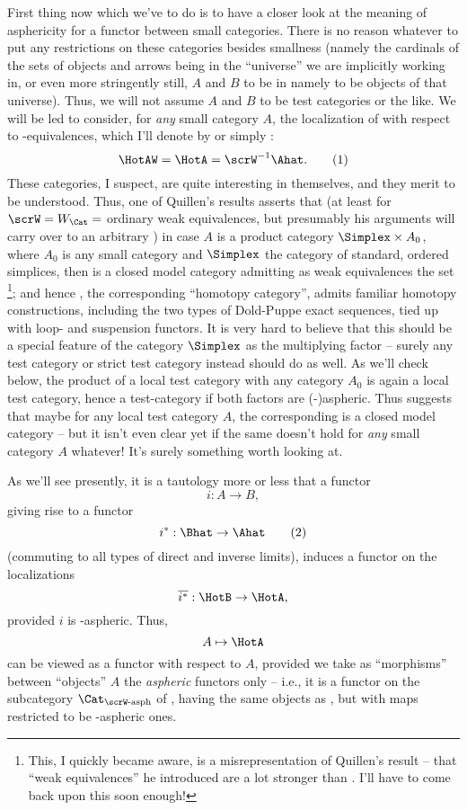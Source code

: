 First thing now which we've to do is to have a closer look at the
meaning of asphericity for a functor between small categories. There
is no reason whatever to put any restrictions on these categories
besides smallness (namely the cardinals of the sets of objects and
arrows being in the ``universe'' we are implicitly working in, or even
more stringently still, $A$ and $B$ to be in \Cat{} namely to be
objects of that universe). Thus, we will not assume $A$ and $B$ to be
test categories or the like. We will be led to consider, for
\emph{any} small category $A$, the localization of \Ahat{} with
respect to \scrW-equivalences, which I'll denote by \HotAW{} or simply
\HotA:
\begin{equation}
  \label{eq:67.1}
  \HotAW=\HotA=\scrW^{-1}\Ahat.\tag{1}
\end{equation}
These categories, I suspect, are quite interesting in
themselves, and they merit to be understood. Thus, one of Quillen's
results asserts that (at least for $\scrW=W_\Cat=$ ordinary weak
equivalences, but presumably his arguments will carry over to an
arbitrary \scrW) in case $A$ is a product category $\Simplex\times A_0$,
where $A_0$ is any small category and $\Simplex$ the category of
standard, ordered simplices, then \Ahat{} is a closed model category
admitting as weak equivalences the set \scrWA\footnote{
  This, I quickly became aware, is a misrepresentation of Quillen's
  result -- that ``weak equivalences'' he introduced are a lot
  stronger than \scrWA. I'll have to come back upon this soon
  enough!}; and hence \HotA, the corresponding ``homotopy category'',
admits familiar homotopy constructions, including the two types of
Dold-Puppe exact sequences, tied up with loop- and suspension
functors. It is very hard to believe that this should be a special
feature of the category $\Simplex$ as the multiplying factor -- surely
any test category or strict test category instead should do as
well. As we'll check below, the product of a local test category with
any category $A_0$ is again a local test category, hence a
test-category if both factors are (\scrW-)aspheric. Thus suggests that
maybe for any local test category $A$, the corresponding \Ahat{} is a
closed model category -- but it isn't even clear yet if the same
doesn't hold for \emph{any} small category $A$ whatever! It's surely
something worth looking at.

As we'll see presently, it is a tautology more or less that a functor
\begin{equation}
  \label{eq:67.1again}
  i:A\to B,\tag{1}
\end{equation}
giving rise to a functor
\begin{equation}
  \label{eq:67.2}
  i^*:\Bhat\to\Ahat\tag{2}
\end{equation}
(commuting to all types of direct and inverse limits), induces a
functor on the localizations
\[\overline{i^*}:\HotB\to\HotA,\]
provided $i$ is \scrW-aspheric. Thus,
\[A\mapsto\HotA\]
can be viewed as a functor with respect to $A$, provided we take as
``morphisms'' between ``objects'' $A$ the \emph{aspheric} functors
only -- i.e., it is a functor on the subcategory
$\Cat_{\textup{\scrW-asph}}$ of \Cat, having the same objects as \Cat,
but with maps restricted to be \scrW-aspheric ones.

